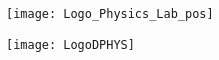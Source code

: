 {%
  \leavevmode%
  \begin{minipage}[.12\textheight]{.4\textwidth}
    \begin{figure}[t]\flushleft\vfill
      \hspace*{.05\textwidth}\texttt{[image: Logo\_Physics\_Lab\_pos]}
    \end{figure}
	\end{minipage}\hfill
	\begin{minipage}[.12\textheight]{.4\textwidth}
    \begin{figure}[t]\flushright\vspace*{7ex}
      \texttt{[image: LogoDPHYS]}\hspace*{.05\textwidth}
    \end{figure}
	\end{minipage}\vspace*{-.03\textheight}
	\begin{center}\VeryHuge
		\textbf{\inserttitle}
	\end{center}
	\hspace*{.05\textwidth}\makebox[.9\textwidth][l]{\rule{.9\textwidth}{.004\textheight}}%
	\vspace*{.007\textheight}
}
